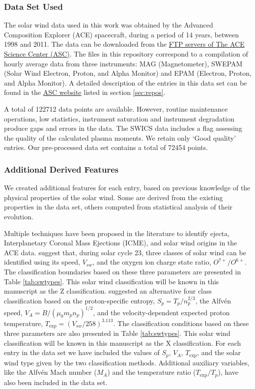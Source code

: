 \subsubsection{Data Set Used}
The solar wind data used in this work was obtained by the Advanced Composition Explorer (ACE) spacecraft, during a period of 14 years, between 1998 and 2011. The data can be downloaded from the \href{ftp://mussel.srl.caltech.edu/pub/ace/level2/multi}{FTP servers of The ACE Science Center (ASC)}. The files in this repository correspond to a compilation of hourly average data from three instruments: MAG (Magnetometer), SWEPAM (Solar Wind Electron, Proton, and Alpha Monitor) and EPAM (Electron, Proton, and Alpha Monitor). A detailed description of the entries in this data set can be found in the \href{http://www.srl.caltech.edu/cgi-bin/dib/rundibviewmultil2/ACE/ASC/DATA/level2/multi}{ASC website} listed in section \ref{sec:repos}.

A total of 122712 data points are available. However, routine maintenance operations, low statistics, instrument saturation and instrument degradation produce gaps and errors in the data. The SWICS data includes a flag assessing the quality of the calculated plasma moments. We retain only `Good quality' entries. Our pre-processed data set contains a total of 72454 points.

\subsubsection{Additional Derived Features}
We created additional features for each entry, based on previous knowledge of the physical properties of the solar wind. Some are derived from the existing properties in the data set, others computed from statistical analysis of their evolution.

Multiple techniques have been proposed in the literature to identify ejecta, Interplanetary Coronal Mass Ejections (ICME), and solar wind origins in the ACE data. \citep{Zhao2009} suggest that, during solar cycle 23, three classes of solar wind can be identified using its speed, $V_{sw}$, and the oxygen ion charge state ratio, $O^{7+}/O^{6+}$. The classification boundaries based on these three parameters are presented in Table \ref{tab:swtypes}. This solar wind classification will be known in this manuscript as the Z classification.
\citep{Xu2015b} suggested an alternative four class classification based on the proton-specific entropy, $S_p = T_p/n_p^{2/3}$, the Alfv\'en speed, $V_A = B / (\mu_0 m_p n_p)^{1/2}$, and the velocity-dependent expected proton temperature, $T_\text{exp} = (V_{sw}/258)^{3.113}$. The classification conditions based on these three parameters are also presented in Table \ref{tab:swtypes}. This solar wind classification will be known in this manuscript as the X classification\citep{Xu2015b}. For each entry in the data set we have included the values of $S_p$, $V_A$, $T_\text{exp}$, and the solar wind type given by the two classification methods. Additional auxiliary variables, like the Alfv\'en Mach number ($M_A$) and the temperature ratio ($T_\text{exp}/T_p$), have also been included in the data set.

